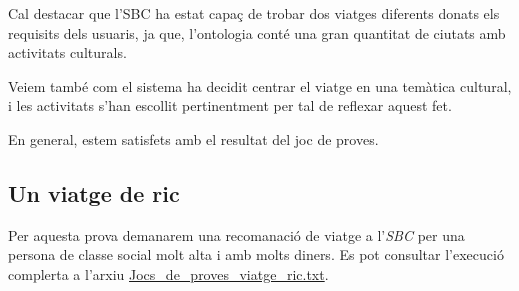 \documentclass[11pt,a4paper]{article}
\begin{document}
Cal destacar que l'SBC ha estat capaç de trobar dos viatges diferents donats els requisits dels usuaris, ja que, l'ontologia conté una gran quantitat de ciutats amb activitats culturals.

Veiem també com el sistema ha decidit centrar el viatge en una temàtica cultural, i les activitats s'han escollit pertinentment per tal de reflexar aquest fet.

En general, estem satisfets amb el resultat del joc de proves.

\subsection{Un viatge de ric}
Per aquesta prova demanarem una recomanació de viatge a l'\emph{SBC} per una persona de classe social molt alta i amb molts diners. Es pot consultar l'execució complerta a l'arxiu \url{Jocs_de_proves_viatge_ric.txt}. \\
\end{document}
